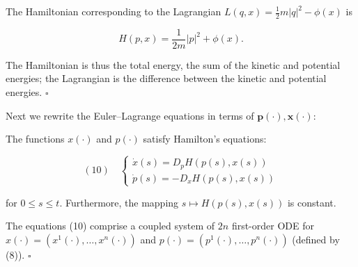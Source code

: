 \begin{example}
\label{ex:hamiltonian-newtons-law}
The Hamiltonian corresponding to the Lagrangian $L(q,x) = \frac{1}{2}m|q|^2 - \phi(x)$ is

$$H(p, x) = \frac{1}{2m}|p|^2 + \phi(x).$$

The Hamiltonian is thus the total energy, the sum of the kinetic and potential energies; the Lagrangian is the difference between the kinetic and potential energies. $\square$
\end{example}

Next we rewrite the Euler--Lagrange equations in terms of $\mathbf{p}(\cdot), \mathbf{x}(\cdot)$:

\begin{theorem}
\label{thm:hamiltons-ode-derivation}
The functions $x(\cdot)$ and $p(\cdot)$ satisfy Hamilton's equations:

$$(10) \quad \begin{cases} \dot{x}(s) = D_p H(p(s), x(s)) \\ \dot{p}(s) = -D_x H(p(s), x(s)) \end{cases}$$

for $0 \le s \le t$. Furthermore, the mapping $s \mapsto H(p(s), x(s))$ is constant.
\end{theorem}

\begin{remark}
\label{rem:hamiltons-ode-system-structure}
The equations (10) comprise a coupled system of $2n$ first-order ODE for $x(\cdot) = (x^1(\cdot), \ldots, x^n(\cdot))$ and $p(\cdot) = (p^1(\cdot), \ldots, p^n(\cdot))$ (defined by (8)). $\square$
\end{remark}

